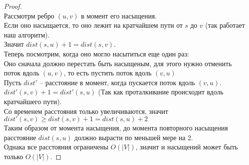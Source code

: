 \begin{proof}\ \\
	Рассмотрм ребро $(u, v)$ в момент его насыщения. \\
	Если оно насыщается, то оно лежит на кратчайшем пути от $s$ до  $v$ (так работает наш алгоритм).\\
	Значит  $dist(s, u) + 1 = dist(s, v).$ \\

	Теперь посмотрим, когда оно могло насытиться еще один раз: \\
	Оно сначала должно перестать быть насыщеным, для этого нужно отменить поток вдоль $(u, v)$, то есть пустить поток вдоль  $(v, u)$ \\
	Пусть  $dist'$ -- расстояние в момент, когда пускается поток вдоль  $(v, u)$. \\
	$dist'(s, v) + 1 = dist'(s, u)$ (Так как проталкивание происходит вдоль кратчайшего пути). \\
	Со временем расстояния только увеличиваются, значит $dist'(s, v) \geq dist(s, v) + 1 = dist(s, u) + 2$ \\
	Таким образом от момента насыщения, до момента повторного насыщения расстояние  $dist(s, u)$ должно вырасти по меньшей мере на 2. \\
	Однака все расстояния ограничены $O(\lvert V \rvert)$, значит и насыщений может быть только $O(\lvert V \rvert)$.
\end{proof}
